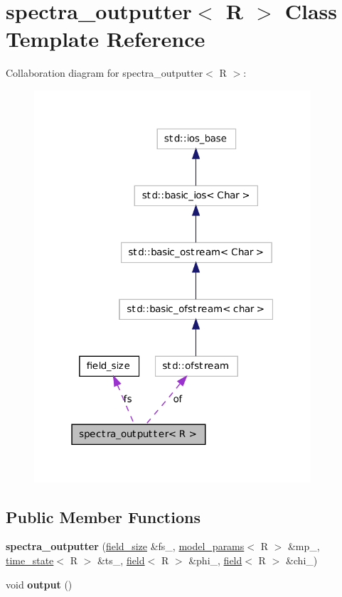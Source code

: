 \hypertarget{classspectra__outputter}{
\section{spectra\_\-outputter$<$ R $>$ Class Template Reference}
\label{classspectra__outputter}
}


Collaboration diagram for spectra\_\-outputter$<$ R $>$:
\nopagebreak
\begin{figure}[H]
\begin{center}
\leavevmode
\includegraphics[width=292pt]{classspectra__outputter__coll__graph}
\end{center}
\end{figure}
\subsection*{Public Member Functions}
\begin{DoxyCompactItemize}
\item 
\hypertarget{classspectra__outputter_aa65c78886ac0787088268f9991bcf5dd}{
{\bfseries spectra\_\-outputter} (\hyperlink{structfield__size}{field\_\-size} \&fs\_\-, \hyperlink{structmodel__params}{model\_\-params}$<$ R $>$ \&mp\_\-, \hyperlink{structtime__state}{time\_\-state}$<$ R $>$ \&ts\_\-, \hyperlink{classfield}{field}$<$ R $>$ \&phi\_\-, \hyperlink{classfield}{field}$<$ R $>$ \&chi\_\-)}
\label{classspectra__outputter_aa65c78886ac0787088268f9991bcf5dd}

\item 
\hypertarget{classspectra__outputter_ad5d72a350a351d5b062c3778b32e66b8}{
void {\bfseries output} ()}
\label{classspectra__outputter_ad5d72a350a351d5b062c3778b32e66b8}

\end{DoxyCompactItemize}
